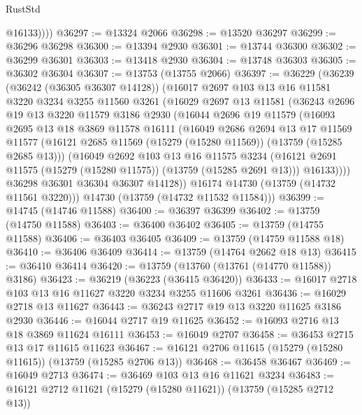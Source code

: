 \begin{lexlean}{RustStd}
\begin{coremodule}
            @16133))))
@36297 := @13324 @2066
@36298 := @13520 @36297
@36299 := @36296 @36298
@36300 := @13394 @2930
@36301 := @13744 @36300
@36302 := @36299 @36301
@36303 := @13418 @2930
@36304 := @13748 @36303
@36305 := @36302 @36304
@36307 := @13753 (@13755 @2066)
@36397 := @36229
    (@36239
      (@36242 (@36305 @36307 @14128))
      (@16017
        @2697
        @103
        @13
        @16
        @11581
        @3220
        @3234
        @3255
        @11560
        @3261
        (@16029
          @2697
          @13
          @11581
          (@36243
            @2696
            @19
            @13
            @3220
            @11579
            @3186
            @2930
            (@16044
              @2696
              @19
              @11579
              (@16093
                @2695
                @13
                @18
                @3869
                @11578
                @16111
                (@16049
                  @2686
                  @2694
                  @13
                  @17
                  @11569
                  @11577
                  (@16121 @2685 @11569 (@15279 (@15280 @11569)) (@13759 (@15285 @2685 @13)))
                  (@16049
                    @2692
                    @103
                    @13
                    @16
                    @11575
                    @3234
                    (@16121 @2691 @11575 (@15279 (@15280 @11575)) (@13759 (@15285 @2691 @13)))
                    @16133))))
            @36298
            @36301
            @36304
            @36307
            @14128))
        @16174
        @14730
        (@13759 (@14732 @11561 @3220)))
      @14730
      (@13759 (@14732 @11532 @11584)))
@36399 := @14745 (@14746 @11588)
@36400 := @36397 @36399
@36402 := @13759 (@14750 @11588)
@36403 := @36400 @36402
@36405 := @13759 (@14755 @11588)
@36406 := @36403 @36405
@36409 := @13759 (@14759 @11588 @18)
@36410 := @36406 @36409
@36414 := @13759 (@14764 @2662 @18 @13)
@36415 := @36410 @36414
@36420 := @13759 (@13760 (@13761 (@14770 @11588)) @3186)
@36423 := @36219 (@36223 (@36415 @36420))
@36433 := @16017 @2718 @103 @13 @16 @11627 @3220 @3234 @3255 @11606 @3261
@36436 := @16029 @2718 @13 @11627
@36443 := @36243 @2717 @19 @13 @3220 @11625 @3186 @2930
@36446 := @16044 @2717 @19 @11625
@36452 := @16093 @2716 @13 @18 @3869 @11624 @16111
@36453 := @16049 @2707
@36458 := @36453 @2715 @13 @17 @11615 @11623
@36467 := @16121 @2706 @11615 (@15279 (@15280 @11615)) (@13759 (@15285 @2706 @13))
@36468 := @36458 @36467
@36469 := @16049 @2713
@36474 := @36469 @103 @13 @16 @11621 @3234
@36483 := @16121 @2712 @11621 (@15279 (@15280 @11621)) (@13759 (@15285 @2712 @13))

\end{coremodule}
\end{lexlean}
